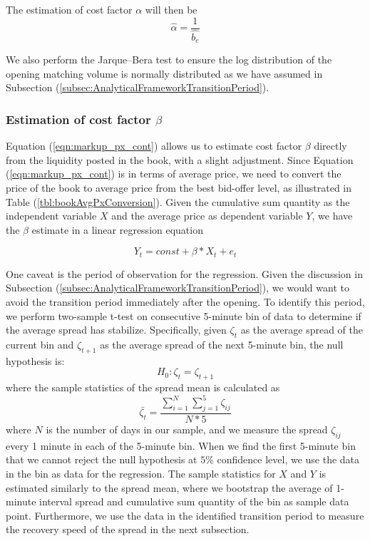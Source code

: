 \documentclass{article}
\begin{document}
The estimation of cost factor $\alpha$ will then be
\[
  \hat{\alpha} = \frac{1}{\hat{b_e}}
\]

We also perform the Jarque–Bera test to ensure the log distribution of the opening matching volume is normally distributed as we have assumed in Subsection (\ref{subsec:AnalyticalFrameworkTransitionPeriod}).

\subsubsection{Estimation of cost factor $\beta$}

Equation (\ref{eqn:markup_px_cont}) allows us to estimate cost factor $\beta$ directly from the liquidity posted in the book, with a slight adjustment. Since Equation (\ref{eqn:markup_px_cont}) is in terms of average price, we need to convert the price of the book to average price from the best bid-offer level, as illustrated in Table (\ref{tbl:bookAvgPxConversion}). Given the cumulative sum quantity as the independent variable $X$ and the average price as dependent variable $Y$, we have the $\beta$ estimate in a linear regression equation

\[
  Y_t = const + \beta * X_t + e_t
\]

One caveat is the period of observation for the regression. Given the discussion in Subsection (\ref{subsec:AnalyticalFrameworkTransitionPeriod}), we would want to avoid the transition period immediately after the opening. To identify this period, we perform two-sample t-test on consecutive 5-minute bin of data to determine if the average spread has stabilize. Specifically, given $\zeta_t$ as the average spread of the current bin and $\zeta_{t+1}$ as the average spread of the next 5-minute bin, the null hypothesis is:
\[
  H_0: \zeta_t = \zeta_{t+1}
\]
where the sample statistics of the spread mean is calculated as
\[
  \bar{\zeta_t} = \frac{\sum_{i=1}^N  \sum_{j=1}^5 \zeta_{ij}}{N*5}
\]
where $N$ is the number of days in our sample, and we measure the spread $\zeta_{ij}$ every 1 minute in each of the 5-minute bin. When we find the first 5-minute bin that we cannot reject the null hypothesis at $5 \%$ confidence level, we use the data in the bin as data for the regression. The sample statistics for $X$ and $Y$ is estimated similarly to the spread mean, where we bootstrap the average of 1-minute interval spread and cumulative sum quantity of the bin as sample data point. Furthermore, we use the data in the identified transition period to measure the recovery speed of the spread in the next subsection.
\end{document}
